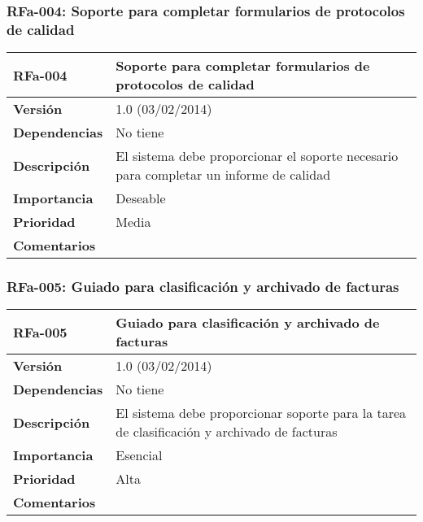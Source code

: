 \subsubsection*{RFa-004: Soporte para completar formularios de protocolos de calidad}
\begin{tabular}{|p{3cm}|p{11.5cm}|}
\hline
\textbf{RFa-004}        & \textbf{Soporte para completar formularios de protocolos de calidad}                                       \\ \hline
\textbf{Versión}        & 1.0 (03/02/2014)                                                                                           \\ \hline
\textbf{Dependencias}   & No tiene                                                                                                   \\ \hline
\textbf{Descripción}    & El sistema debe proporcionar el soporte necesario para completar un informe de calidad                     \\ \hline
\textbf{Importancia}    & Deseable                                                                                                   \\ \hline
\textbf{Prioridad}      & Media                                                                                                      \\ \hline
\textbf{Comentarios}    &                                                                                                            \\ \hline
\end{tabular}

\subsubsection*{RFa-005: Guiado para clasificación y archivado de facturas}
\begin{tabular}{|p{3cm}|p{11.5cm}|}
\hline
\textbf{RFa-005}        & \textbf{Guiado para clasificación y archivado de facturas}                                                \\ \hline
\textbf{Versión}        & 1.0 (03/02/2014)                                                                                           \\ \hline
\textbf{Dependencias}   & No tiene                                                                                                   \\ \hline
\textbf{Descripción}    & El sistema debe proporcionar soporte para la tarea de clasificación y archivado de facturas                \\ \hline
\textbf{Importancia}    & Esencial                                                                                                   \\ \hline
\textbf{Prioridad}      & Alta                                                                                                       \\ \hline
\textbf{Comentarios}    &                                                                                                            \\ \hline
\end{tabular}

